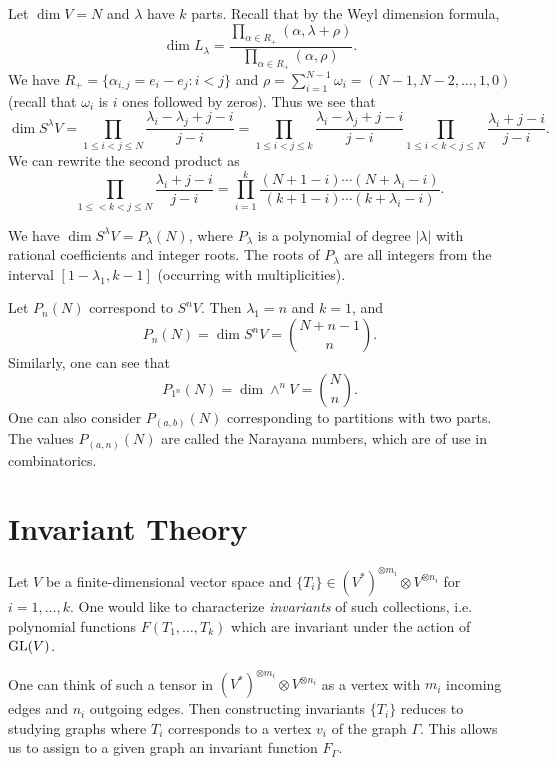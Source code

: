 \begin{remark}
  Let $\dim V = N$ and $\lambda$ have
  $k$ parts.
  Recall that by the Weyl dimension
  formula,
  \[
    \dim L_\lambda
    = \frac{\prod_{\alpha \in R_+} (\alpha, \lambda + \rho)}{\prod_{\alpha \in R_+} (\alpha, \rho)}.
  \]
  We have
  $R_+ = \{\alpha_{i, j} = e_i - e_j : i < j\}$
  and $\rho = \sum_{i = 1}^{N - 1} \omega_i = (N - 1, N - 2, \dots, 1, 0)$
  (recall that $\omega_i$ is $i$
  ones followed by zeros). Thus we
  see that
  \[
    \dim S^\lambda V
    = \prod_{1 \le i < j \le N} \frac{\lambda_i - \lambda_j + j - i}{j - i}
    = \prod_{1 \le i < j \le k} \frac{\lambda_i - \lambda_j + j - i}{j - i}
    \prod_{1 \le i < k < j \le N}
    \frac{\lambda_i + j - i}{j - i}.
  \]
  We can rewrite the second product as
  \[
    \prod_{1 \le < k < j \le N}
    \frac{\lambda_i + j - i}{j - i}
    = \prod_{i = 1}^k
    \frac{(N + 1 - i) \cdots (N + \lambda_i - i)}{(k + 1 - i) \cdots (k + \lambda_i - i)}.
  \]
\end{remark}

\begin{prop}
  We have $\dim S^\lambda V = P_\lambda(N)$,
  where $P_\lambda$ is a polynomial
  of degree $|\lambda|$ with rational
  coefficients and integer roots.
  The roots of $P_\lambda$ are all
  integers from the interval
  $[1 - \lambda_1, k - 1]$
  (occurring with multiplicities).
\end{prop}

\begin{example}
  Let $P_n(N)$ correspond to $S^n V$.
  Then $\lambda_1 = n$ and $k = 1$, and
  \[
    P_n(N)
    = \dim S^n V
    = \binom{N + n - 1}{n}.
  \]
  Similarly, one can see that
  \[
    P_{1^n}(N)
    = \dim \wedge^n V = \binom{N}{n}.
  \]
  One can also consider
  $P_{(a, b)}(N)$ corresponding
  to partitions with
  two parts.
  The values $P_{(a, n)}(N)$
  are called the
  Narayana numbers, which are of use
  in combinatorics.
\end{example}

\section{Invariant Theory}

\begin{remark}
  Let $V$ be a finite-dimensional
  vector space and
  $\{T_i\} \in (V^*)^{\otimes m_i} \otimes V^{\otimes n_i}$
  for $i = 1, \dots, k$. One would
  like to characterize \emph{invariants}
  of such collections, i.e.
  polynomial functions
  $F(T_1, \dots, T_k)$ which are
  invariant under the action of
  $\operatorname{GL}(V)$.

  One can think of such a tensor
  in $(V^*)^{\otimes m_i} \otimes V^{\otimes n_i}$
  as a vertex with $m_i$ incoming
  edges and $n_i$ outgoing edges.
  Then constructing invariants
  $\{T_i\}$ reduces to studying
  graphs where $T_i$ corresponds to
  a vertex $v_i$ of the graph $\Gamma$.
  This allows us to assign to a given
  graph an invariant function
  $F_{\Gamma}$.
\end{remark}

